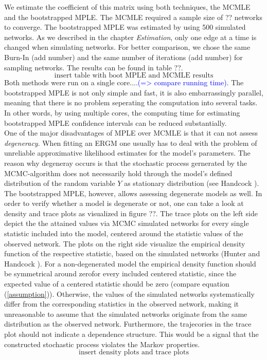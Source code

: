 \documentclass[headsepline=true, abstracton]{scrartcl}
\begin{document}
We estimate the coefficient of this matrix using both techniques, the MCMLE and the bootstrapped MPLE. The MCMLE required a sample size of ?? networks to converge. The bootstrapped MPLE was estimated by using 500 simulated networks. As we described in the chapter {\it Estimation}, only one edge at a time is changed when simulating networks. For better comparison, we chose the same Burn-In (add number) and the same number of iterations (add number) for sampling networks. The results can be found in table ??.
\\[0.3cm]
$$\text{insert table with boot MPLE and MCMLE results}$$
Both methods were run on a single core....\textcolor{blue}{(=> compare running time)}. The bootstrapped MPLE is not only simple and fast, it is also embarrassingly parallel, meaning that there is no problem seperating the computation into several tasks. In other words, by using multiple cores, the computing time for estimating bootstrapped MPLE confidence intervals can be reduced substantially.\\[0.3cm]
One of the major disadvantages of MPLE over MCMLE is that it can not assess {\it degeneracy}. When fitting an ERGM one usually has to deal with the problem of unreliable approximative likelihood estimates for the model's parameters. The reason why degeneray occurs is that the stochastic process gernerated by the MCMC-algorithm does not necessarily hold through the model's defined distribution of the random variable $Y$ as stationary distribution (see Handcock \cite{Handcock.2003}). The bootstrapped MPLE, however, allows assessing degenerate models as well. In order to verify whether a model is degenerate or not, one can take a look at density and trace plots as visualized in figure ??. The trace plots on the left side depict the the attained values via MCMC simulated networks for every single statistic included into the model, centered around the statistic values of the observed network. The plots on the right side visualize the empirical density function of the respective statistic, based on the simulated networks (Hunter and Handcock \cite{Hunter.2006}). For a non-degenerated model the empirical density function should be symmetrical around zerofor every included centered statistic, since the expected value of a centered statistic should be zero (compare equation (\ref{assumption})). 
Otherwise, the values of the simulated networks systematically differ from the corresponding statistics in the observed network, making it unreasonable to assume that the simulated networks originate from the same distribution as the observed network. Furthermore, the trajecories in the trace plot should not indicate a dependence structure. This would be a signal that the constructed stochastic process violates the Markov properties.
$$\text{insert density plots and trace plots}$$
\end{document}
